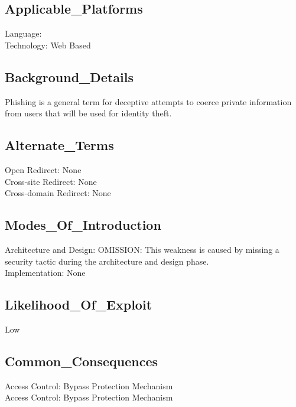 \subsection*{Applicable\_Platforms}
Language: \\
Technology: Web Based\\
\subsection*{Background\_Details}
Phishing is a general term for deceptive attempts to coerce private information from users that will be used for identity theft.\\
\subsection*{Alternate\_Terms}
Open Redirect: None\\
Cross-site Redirect: None\\
Cross-domain Redirect: None\\
\subsection*{Modes\_Of\_Introduction}
Architecture and Design: OMISSION: This weakness is caused by missing a security tactic during the architecture and design phase.\\
Implementation: None\\
\subsection*{Likelihood\_Of\_Exploit}
Low

\subsection*{Common\_Consequences}
Access Control: Bypass Protection Mechanism\\
Access Control: Bypass Protection Mechanism\\
